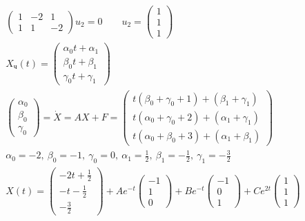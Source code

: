 \begin{gather*}
\begin{pmatrix}
		1 & -2 & 1\\
		1 & 1 & -2
	\end{pmatrix}
	u_2 = 0\qquad
	u_2 = 
	\begin{pmatrix}
		1 \\ 1 \\ 1
	\end{pmatrix}\\
	X_{\text{ч}}(t) = 
	\begin{pmatrix}
		\alpha_0 t + \alpha_1\\
		\beta_0 t + \beta_1\\
		\gamma_0 t + \gamma_1
	\end{pmatrix}\\
	\begin{pmatrix}
		\alpha_0 \\ \beta_0 \\ \gamma_0
	\end{pmatrix}
	= \dot{X} = AX + F =
	\begin{pmatrix}
		t(\beta_0 + \gamma_0 + 1) + (\beta_1 + \gamma_1)\\
		t(\alpha_0 + \gamma_0 + 2) + (\alpha_1 + \gamma_1)\\
		t(\alpha_0 + \beta_0 + 3) + (\alpha_1 + \beta_1)
	\end{pmatrix}\\
	\alpha_0 = -2,\ \beta_0 = -1,\ \gamma_0 = 0,\ \alpha_1 = \frac{1}{2},\ \beta_1 = -\frac{1}{2},\ \gamma_1 = -\frac{3}{2}\\
	X(t) = 
	\begin{pmatrix}
		-2t + \frac{1}{2} \\ -t - \frac{1}{2} \\ -\frac{3}{2}
	\end{pmatrix}
	+ A e^{-t}
	\begin{pmatrix}
		-1 \\ 1 \\ 0
	\end{pmatrix}
	+ B e^{-t}
	\begin{pmatrix}
		-1 \\ 0 \\ 1
	\end{pmatrix}
	+ C e^{2t}
	\begin{pmatrix}
		1 \\ 1 \\ 1
	\end{pmatrix}
	\end{gather*}